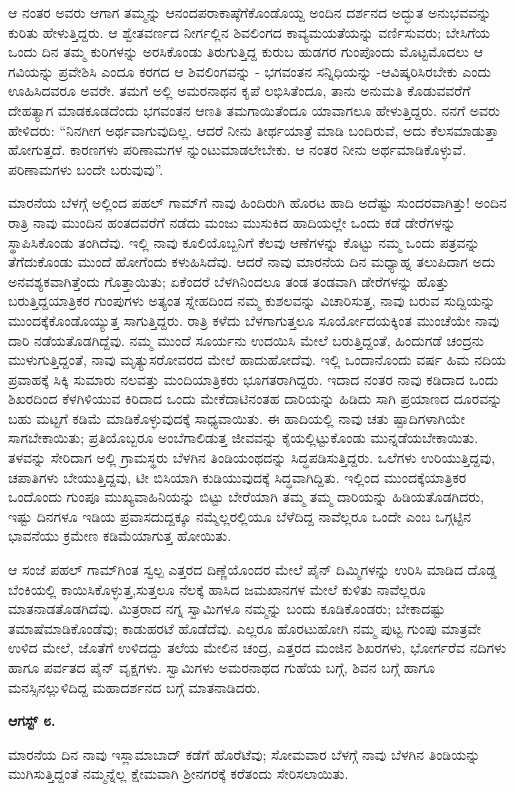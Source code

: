 ಆ ನಂತರ ಅವರು ಆಗಾಗ ತಮ್ಮನ್ನು ಆನಂದಪರಾಕಾಷ್ಠೆಗೆಕೊಂಡೊಯ್ದ ಅಂದಿನ ದರ್ಶನದ ಅದ್ಭುತ ಅನುಭವವನ್ನು ಕುರಿತು ಹೇಳುತ್ತಿದ್ದರು. ಆ ಶ್ವೇತವರ್ಣದ ನೀರ್ಗಲ್ಲಿನ ಶಿವಲಿಂಗದ ಕಾವ್ಯಮಯತೆಯನ್ನು ವರ್ಣಿಸುವರು; ಬೇಸಿಗೆಯ ಒಂದು ದಿನ ತಮ್ಮ ಕುರಿಗಳನ್ನು ಅರಸಿಕೊಂಡು ತಿರುಗುತ್ತಿದ್ದ ಕುರುಬ ಹುಡಗರ ಗುಂಪೊಂದು ಮೊಟ್ಟಮೊದಲು ಆ ಗವಿಯನ್ನು ಪ್ರವೇಶಿಸಿ ಎಂದೂ ಕರಗದ ಆ ಶಿವಲಿಂಗವನ್ನು - ಭಗವಂತನ ಸನ್ನಿಧಿಯನ್ನು -ಆವಿಷ್ಕರಿಸಿರಬೇಕು ಎಂದು ಊಹಿಸಿದವರೂ ಅವರೇ. ತಮಗೆ ಅಲ್ಲಿ ಅಮರನಾಥನ ಕೃಪೆ ಲಭಿಸಿತೆಂದೂ, ತಾನು ಅನುಮತಿ ಕೊಡುವವರೆಗೆ ದೇಹತ್ಯಾಗ ಮಾಡಕೂಡದೆಂದು ಭಗವಂತನ ಆಣತಿ ತಮಗಾಯಿತೆಂದೂ ಯಾವಾಗಲೂ ಹೇಳುತ್ತಿದ್ದರು. ನನಗೆ ಅವರು ಹೇಳಿದರು: “ನಿನಗೀಗ ಅರ್ಥವಾಗುವುದಿಲ್ಲ. ಆದರೆ ನೀನು ತೀರ್ಥಯಾತ್ರೆ ಮಾಡಿ ಬಂದಿರುವೆ, ಅದು ಕೆಲಸಮಾಡುತ್ತಾ ಹೋಗುತ್ತದೆ. ಕಾರಣಗಳು ಪರಿಣಾಮಗಳ ನ್ನುಂಟುಮಾಡಲೇಬೇಕು. ಆ ನಂತರ ನೀನು ಅರ್ಥಮಾಡಿಕೊಳ್ಳುವೆ. ಪರಿಣಾಮಗಳು ಬಂದೇ ಬರುವುವು”.

ಮಾರನೆಯ ಬೆಳಗ್ಗೆ ಅಲ್ಲಿಂದ ಪಹಲ್ ಗಾಮ್​ಗೆ ನಾವು ಹಿಂದಿರುಗಿ ಹೊರಟ ಹಾದಿ ಅದೆಷ್ಟು ಸುಂದರವಾಗಿತ್ತು! ಅಂದಿನ ರಾತ್ರಿ ನಾವು ಮುಂದಿನ ಹಂತದವರೆಗೆ ನಡೆದು ಮಂಜು ಮುಸುಕಿದ ಹಾದಿಯಲ್ಲೇ ಒಂದು ಕಡೆ ಡೇರೆಗಳನ್ನು ಸ್ಥಾಪಿಸಿಕೊಂಡು ತಂಗಿದೆವು. ಇಲ್ಲಿ ನಾವು ಕೂಲಿಯೊಬ್ಬನಿಗೆ ಕೆಲವು ಆಣೆಗಳನ್ನು ಕೊಟ್ಟು ನಮ್ಮ ಒಂದು ಪತ್ರವನ್ನು ತೆಗೆದುಕೊಂಡು ಮುಂದೆ ಹೋಗೆಂದು ಕಳುಹಿಸಿದೆವು. ಆದರೆ ನಾವು ಮಾರನೆಯ ದಿನ ಮಧ್ಯಾಹ್ನ ತಲುಪಿದಾಗ ಅದು ಅನವಶ್ಯಕವಾಗಿತ್ತೆಂದು ಗೊತ್ತಾಯಿತು; ಏಕೆಂದರೆ ಬೆಳಗಿನಿಂದಲೂ ತಂಡ ತಂಡವಾಗಿ ಡೇರೆಗಳನ್ನು ಹೊತ್ತು ಬರುತ್ತಿದ್ದಯಾತ್ರಿಕರ ಗುಂಪುಗಳು ಅತ್ಯಂತ ಸ್ನೇಹದಿಂದ ನಮ್ಮ ಕುಶಲವನ್ನು ವಿಚಾರಿಸುತ್ತ, ನಾವು ಬರುವ ಸುದ್ದಿಯನ್ನು ಮುಂದಕ್ಕೆಕೊಂಡೊಯ್ಯುತ್ತ ಸಾಗುತ್ತಿದ್ದರು. ರಾತ್ರಿ ಕಳೆದು ಬೆಳಗಾಗುತ್ತಲೂ ಸೂರ್ಯೋದಯಕ್ಕಿಂತ ಮುಂಚೆಯೇ ನಾವು ದಾರಿ ನಡೆಯತೊಡಗಿದ್ದೆವು. ನಮ್ಮ ಮುಂದೆ ಸೂರ್ಯನು ಉದಯಿಸಿ ಮೇಲೆ ಬರುತ್ತಿದ್ದಂತೆ, ಹಿಂದುಗಡೆ ಚಂದ್ರನು ಮುಳುಗುತ್ತಿದ್ದಂತೆ, ನಾವು ಮೃತ್ಯುಸರೋವರದ ಮೇಲೆ ಹಾದುಹೋದೆವು. ಇಲ್ಲಿ ಒಂದಾನೊಂದು ವರ್ಷ ಹಿಮ ನದಿಯ ಪ್ರವಾಹಕ್ಕೆ ಸಿಕ್ಕಿ ಸುಮಾರು ನಲವತ್ತು ಮಂದಿಯಾತ್ರಿಕರು ಭೂಗತರಾಗಿದ್ದರು. ಇದಾದ ನಂತರ ನಾವು ಕಡಿದಾದ ಒಂದು ಶಿಖರದಿಂದ ಕೆಳಗಿಳಿಯುವ ಕಿರಿದಾದ ಒಂದು ಮೇಕೆದಾಟಿನಂತಹ ದಾರಿಯನ್ನು ಹಿಡಿದು ಸಾಗಿ ಪ್ರಯಾಣದ ದೂರವನ್ನು ಬಹು ಮಟ್ಟಗೆ ಕಡಿಮೆ ಮಾಡಿಕೊಳ್ಳುವುದಕ್ಕೆ ಸಾಧ್ಯವಾಯಿತು. ಈ ಹಾದಿಯಲ್ಲಿ ನಾವು ಚತು ಷ್ಪಾದಿಗಳಾಗಿಯೇ ಸಾಗಬೇಕಾಯಿತು; ಪ್ರತಿಯೊಬ್ಬರೂ ಅಂಬೆಗಾಲಿಡುತ್ತ ಜೀವವನ್ನು ಕೈಯಲ್ಲಿಟ್ಟುಕೊಂಡು ಮುನ್ನಡೆಯಬೇಕಾಯಿತು. ತಳವನ್ನು ಸೇರಿದಾಗ ಅಲ್ಲಿ ಗ್ರಾಮಸ್ಥರು ಬೆಳಗಿನ ತಿಂಡಿಯಂಥದನ್ನು ಸಿದ್ಧಪಡಿಸುತ್ತಿದ್ದರು. ಒಲೆಗಳು ಉರಿಯುತ್ತಿದ್ದವು, ಚಪಾತಿಗಳು ಬೇಯುತ್ತಿದ್ದವು, ಟೀ ಬಿಸಿಯಾಗಿ ಕುಡಿಯುವುದಕ್ಕೆ ಸಿದ್ಧವಾಗಿದ್ದಿತು. ಇಲ್ಲಿಂದ ಮುಂದಕ್ಕೆಯಾತ್ರಿಕರ ಒಂದೊಂದು ಗುಂಪೂ ಮುಖ್ಯವಾಹಿನಿಯನ್ನು ಬಿಟ್ಟು ಬೇರೆಯಾಗಿ ತಮ್ಮ ತಮ್ಮ ದಾರಿಯನ್ನು ಹಿಡಿಯತೊಡಗಿದರು, ಇಷ್ಟು ದಿನಗಳೂ ಇಡಿಯ ಪ್ರವಾಸದುದ್ದಕ್ಕೂ ನಮ್ಮೆಲ್ಲರಲ್ಲಿಯೂ ಬೆಳೆದಿದ್ದ ನಾವೆಲ್ಲರೂ ಒಂದೇ ಎಂಬ ಒಗ್ಗಟ್ಟಿನ ಭಾವನೆಯು ಕ್ರಮೇಣ ಕಡಿಮೆಯಾಗುತ್ತ ಹೋಯಿತು.

ಆ ಸಂಜೆ ಪಹಲ್ ಗಾಮ್​ಗಿಂತ ಸ್ವಲ್ಪ ಎತ್ತರದ ದಿಣ್ಣೆಯೊಂದರ ಮೇಲೆ ಪೈನ್ ದಿಮ್ಮಿಗಳನ್ನು ಉರಿಸಿ ಮಾಡಿದ ದೊಡ್ಡ ಬೆಂಕಿಯಲ್ಲಿ ಕಾಯಿಸಿಕೊಳ್ಳುತ್ತ,ಸುತ್ತಲೂ ನೆಲಕ್ಕೆ ಹಾಸಿದ ಜಮಖಾನಗಳ ಮೇಲೆ ಕುಳಿತು ನಾವೆಲ್ಲರೂ ಮಾತನಾಡತೊಡಗಿದೆವು. ಮಿತ್ರರಾದ ನಗ್ನ ಸ್ವಾಮಿಗಳೂ ನಮ್ಮನ್ನು ಬಂದು ಕೂಡಿಕೊಂಡರು; ಬೇಕಾದಷ್ಟು ತಮಾಷೆಮಾಡಿಕೊಂಡೆವು; ಕಾಡುಹರಟೆ ಹೊಡೆದೆವು. ಎಲ್ಲರೂ ಹೊರಟುಹೋಗಿ ನಮ್ಮ ಪುಟ್ಟ ಗುಂಪು ಮಾತ್ರವೇ ಉಳಿದ ಮೇಲೆ, ಜೊತೆಗೆ ಉಳಿದದ್ದು ತಲೆಯ ಮೇಲಿನ ಚಂದ್ರ, ಎತ್ತರದ ಮಂಜಿನ ಶಿಖರಗಳು, ಭೋರ್ಗರೆವ ನದಿಗಳು ಹಾಗೂ ಪರ್ವತದ ಪೈನ್ ವೃಕ್ಷಗಳು. ಸ್ವಾಮಿಗಳು ಅಮರನಾಥದ ಗುಹೆಯ ಬಗ್ಗೆ, ಶಿವನ ಬಗ್ಗೆ ಹಾಗೂ ಮನಸ್ಸಿನಲ್ಲುಳಿದಿದ್ದ ಮಹಾದರ್ಶನದ ಬಗ್ಗೆ ಮಾತನಾಡಿದರು.

\textbf{ಆಗಸ್ಟ್ ೮.}

ಮಾರನೆಯ ದಿನ ನಾವು ಇಸ್ಲಾಮಾಬಾದ್ ಕಡೆಗೆ ಹೊರೆಟೆವು; ಸೋಮವಾರ ಬೆಳಗ್ಗೆ ನಾವು ಬೆಳಗಿನ ತಿಂಡಿಯನ್ನು ಮುಗಿಸುತ್ತಿದ್ದಂತೆ ನಮ್ಮನ್ನೆಲ್ಲ ಕ್ಷೇಮವಾಗಿ ಶ‍್ರೀನಗರಕ್ಕೆ ಕರೆತಂದು ಸೇರಿಸಲಾಯಿತು.

